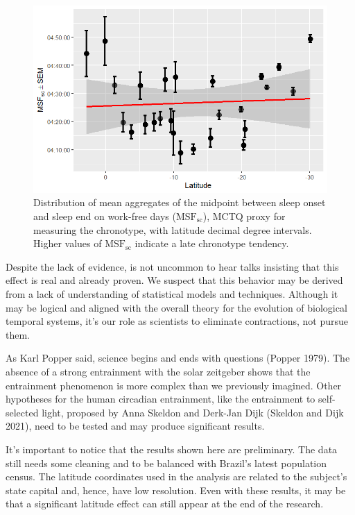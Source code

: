 \documentclass[
  12pt,
  a4paper,
  oneside]{tesesusp}
\begin{document}
\begin{figure}[H]

\caption{\label{fig-ch-6-chronotype-distribution-by-latitude}Distribution
of mean aggregates of the midpoint between sleep onset and sleep end on
work-free days (\(\text{MSF}_{\text{sc}}\)), MCTQ proxy for measuring
the chronotype, with latitude decimal degree intervals. Higher values of
\(\text{MSF}_{\text{sc}}\) indicate a late chronotype tendency.}

{\centering \includegraphics{qmd/chapter-6_files/figure-pdf/fig-ch-6-chronotype-distribution-by-latitude-1.png}

}

\end{figure}

Despite the lack of evidence, is not uncommon to hear talks insisting
that this effect is real and already proven. We suspect that this
behavior may be derived from a lack of understanding of statistical
models and techniques. Although it may be logical and aligned with the
overall theory for the evolution of biological temporal systems, it's
our role as scientists to eliminate contractions, not pursue them.

As Karl Popper said, science begins and ends with questions (Popper
1979). The absence of a strong entrainment with the solar zeitgeber
shows that the entrainment phenomenon is more complex than we previously
imagined. Other hypotheses for the human circadian entrainment, like the
entrainment to self-selected light, proposed by Anna Skeldon and
Derk-Jan Dijk (Skeldon and Dijk 2021), need to be tested and may produce
significant results.

It's important to notice that the results shown here are preliminary.
The data still needs some cleaning and to be balanced with Brazil's
latest population census. The latitude coordinates used in the analysis
are related to the subject's state capital and, hence, have low
resolution. Even with these results, it may be that a significant
latitude effect can still appear at the end of the research.
\end{document}
